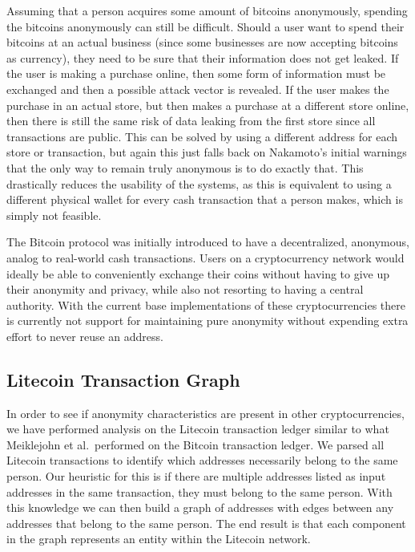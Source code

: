 \documentclass[11pt]{article}
\begin{document}
Assuming that a person acquires some amount of bitcoins anonymously, spending the bitcoins anonymously can still be
difficult. Should a user want to spend their bitcoins at an actual business (since some businesses are now accepting
bitcoins as currency), they need to be sure that their information does not get leaked. If the user is making a purchase
online, then some form of information must be exchanged and then a possible attack vector is revealed. If the user makes
the purchase in an actual store, but then makes a purchase at a different store online, then there is still the same
risk of data leaking from the first store since all transactions are public. This can be solved by using a different
address for each store or transaction, but again this just falls back on Nakamoto's initial warnings that the only way
to remain truly anonymous is to do exactly that. This drastically reduces the usability of the systems, as this is
equivalent to using a different physical wallet for every cash transaction that a person makes, which is simply not
feasible.

The Bitcoin protocol was initially introduced to have a decentralized, anonymous, analog to real-world cash
transactions.  Users on a cryptocurrency network would ideally be able to conveniently exchange their coins without
having to give up their anonymity and privacy, while also not resorting to having a central authority. With the current
base implementations of these cryptocurrencies there is currently not support for maintaining pure anonymity without
expending extra effort to never reuse an address.

\subsection{Litecoin Transaction Graph}
In order to see if anonymity characteristics are present in other cryptocurrencies, we have performed analysis on the
Litecoin transaction ledger similar to what \mbox{Meiklejohn} et al.\ performed on the Bitcoin transaction
ledger\cite{meiklejohn13}. We parsed all Litecoin transactions to identify which addresses necessarily belong to the
same person. Our heuristic for this is if there are multiple addresses listed as input addresses in the same
transaction, they must belong to the same person. With this knowledge we can then build a graph of addresses with edges
between any addresses that belong to the same person. The end result is that each component in the graph represents an
entity within the Litecoin network.
\end{document}
